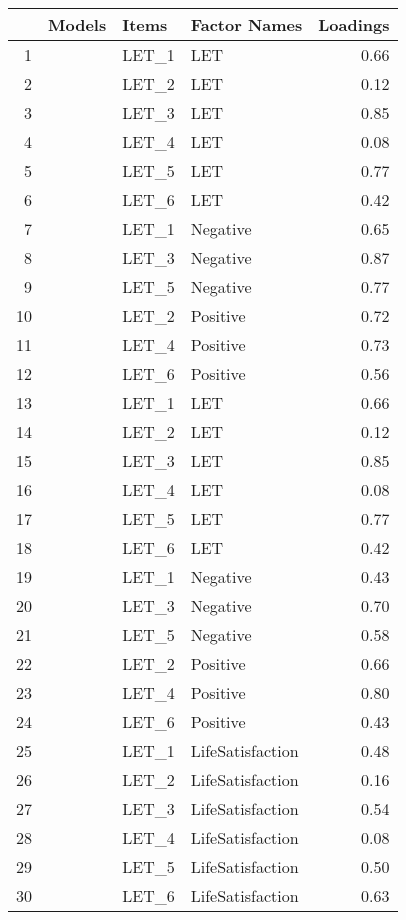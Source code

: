 \documentclass{article}\usepackage[]{graphicx}\usepackage[]{color}
\begin{document}
\begin{table}[ht]
\centering
\begin{tabular}{rlllr}
  \hline
 & Models & Items & Factor Names & Loadings \\ 
  \hline
1 &  & LET\_1 & LET & 0.66 \\ 
  2 &  & LET\_2 & LET & 0.12 \\ 
  3 &  & LET\_3 & LET & 0.85 \\ 
  4 &  & LET\_4 & LET & 0.08 \\ 
  5 &  & LET\_5 & LET & 0.77 \\ 
  6 &  & LET\_6 & LET & 0.42 \\ 
  7 &  & LET\_1 & Negative & 0.65 \\ 
  8 &  & LET\_3 & Negative & 0.87 \\ 
  9 &  & LET\_5 & Negative & 0.77 \\ 
  10 &  & LET\_2 & Positive & 0.72 \\ 
  11 &  & LET\_4 & Positive & 0.73 \\ 
  12 &  & LET\_6 & Positive & 0.56 \\ 
  13 &  & LET\_1 & LET & 0.66 \\ 
  14 &  & LET\_2 & LET & 0.12 \\ 
  15 &  & LET\_3 & LET & 0.85 \\ 
  16 &  & LET\_4 & LET & 0.08 \\ 
  17 &  & LET\_5 & LET & 0.77 \\ 
  18 &  & LET\_6 & LET & 0.42 \\ 
  19 &  & LET\_1 & Negative & 0.43 \\ 
  20 &  & LET\_3 & Negative & 0.70 \\ 
  21 &  & LET\_5 & Negative & 0.58 \\ 
  22 &  & LET\_2 & Positive & 0.66 \\ 
  23 &  & LET\_4 & Positive & 0.80 \\ 
  24 &  & LET\_6 & Positive & 0.43 \\ 
  25 &  & LET\_1 & LifeSatisfaction & 0.48 \\ 
  26 &  & LET\_2 & LifeSatisfaction & 0.16 \\ 
  27 &  & LET\_3 & LifeSatisfaction & 0.54 \\ 
  28 &  & LET\_4 & LifeSatisfaction & 0.08 \\ 
  29 &  & LET\_5 & LifeSatisfaction & 0.50 \\ 
  30 &  & LET\_6 & LifeSatisfaction & 0.63 \\ 

\end{tabular}
\end{table}
\end{document}
